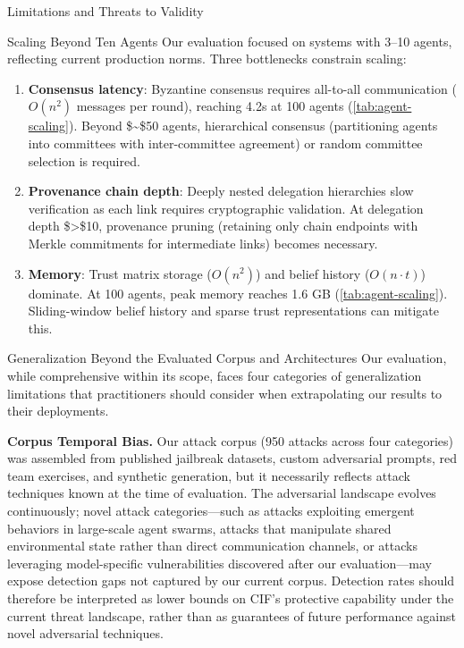 \documentclass[
  ignorenonframetext,
]{beamer}
\begin{document}
\begin{frame}{Limitations and Threats to Validity}
\begin{block}{Scaling Beyond Ten Agents}
\protect{}\label{scaling-beyond-ten-agents}
Our evaluation focused on systems with 3--10 agents, reflecting current
production norms. Three bottlenecks constrain scaling:

\begin{enumerate}
\item
  \textbf{Consensus latency}: Byzantine consensus requires all-to-all
  communication (\(O(n^2)\) messages per round), reaching 4.2s at 100
  agents (\cref{tab:agent-scaling}). Beyond \$\sim\$50 agents,
  hierarchical consensus (partitioning agents into committees with
  inter-committee agreement) or random committee selection is required.
\item
  \textbf{Provenance chain depth}: Deeply nested delegation hierarchies
  slow verification as each link requires cryptographic validation. At
  delegation depth \$\textgreater\$10, provenance pruning (retaining
  only chain endpoints with Merkle commitments for intermediate links)
  becomes necessary.
\item
  \textbf{Memory}: Trust matrix storage (\(O(n^2)\)) and belief history
  (\(O(n \cdot t)\)) dominate. At 100 agents, peak memory reaches 1.6 GB
  (\cref{tab:agent-scaling}). Sliding-window belief history and sparse
  trust representations can mitigate this.
\end{enumerate}
\end{block}

\begin{block}{Generalization Beyond the Evaluated Corpus and
Architectures}
\protect{}\label{generalization-beyond-the-evaluated-corpus-and-architectures}
Our evaluation, while comprehensive within its scope, faces four
categories of generalization limitations that practitioners should
consider when extrapolating our results to their deployments.

\textbf{Corpus Temporal Bias.} Our attack corpus (950 attacks across
four categories) was assembled from published jailbreak datasets, custom
adversarial prompts, red team exercises, and synthetic generation, but
it necessarily reflects attack techniques known at the time of
evaluation. The adversarial landscape evolves continuously; novel attack
categories---such as attacks exploiting emergent behaviors in
large-scale agent swarms, attacks that manipulate shared environmental
state rather than direct communication channels, or attacks leveraging
model-specific vulnerabilities discovered after our evaluation---may
expose detection gaps not captured by our current corpus. Detection
rates should therefore be interpreted as lower bounds on CIF's
protective capability under the current threat landscape, rather than as
guarantees of future performance against novel adversarial techniques.


\end{block}
\end{frame}
\end{document}
